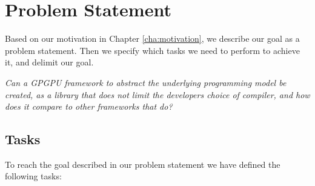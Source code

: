 \section{Problem Statement}
Based on our motivation in Chapter \ref{cha:motivation}, we describe our goal as a problem statement. Then we specify which tasks we need to perform to achieve it, and delimit our goal.

\textit{Can a GPGPU framework to abstract the underlying programming model be created, as a library that does not limit the developers choice of compiler, and
how does it compare to other frameworks that do?}


\subsection{Tasks} \label{cha:tasks}
To reach the goal described in our problem statement we have defined the following tasks:


